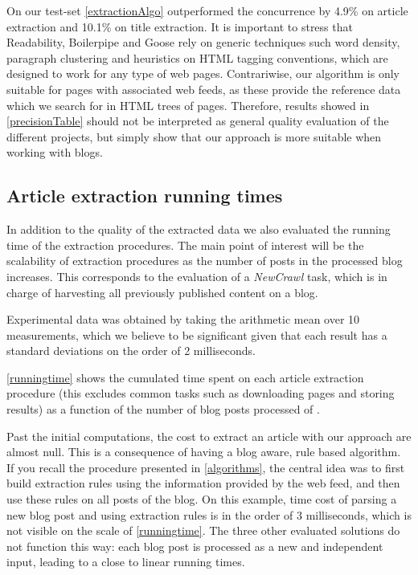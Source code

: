 \precisionTable

On our test-set \autoref{extractionAlgo} outperformed the concurrence by 4.9\% on article extraction and 10.1\% on title extraction. It is important to stress that Readability, Boilerpipe and Goose rely on generic techniques such word density, paragraph clustering and heuristics on HTML tagging conventions, which are designed to work for any type of web pages. Contrariwise, our algorithm is only suitable for pages with associated web feeds, as these provide the reference data which we search for in HTML trees of pages. Therefore, results showed in \autoref{precisionTable} should not be interpreted as general quality evaluation of the different projects, but simply show that our approach is more suitable when working with blogs.


\subsection{Article extraction running times}

In addition to the quality of the extracted data we also evaluated the running time of the extraction procedures. The main point of interest will be the scalability of extraction procedures as the number of posts in the processed blog increases. This corresponds to the evaluation of a \emph{NewCrawl} task, which is in charge of harvesting all previously published content on a blog.

Experimental data was obtained by taking the arithmetic mean over 10 measurements, which we believe to be significant given that each result has a standard deviations on the order of 2 milliseconds. 

\autoref{runningtime} shows the cumulated time spent on each article extraction procedure (this excludes common tasks such as downloading pages and storing results) as a function of the number of blog posts processed of .



Past the initial computations, the cost to extract an article with our approach are almost null. This is a consequence of having a blog aware, rule based algorithm. If you recall the procedure presented in \autoref{algorithms}, the central idea was to first build extraction rules using the information provided by the web feed, and then use these rules on all posts of the blog. On this example, time cost of parsing a new blog post and using extraction rules is in the order of 3 milliseconds, which is not visible on the scale of \autoref{runningtime}. The three other evaluated solutions do not function this way: each blog post is processed as a new and independent input, leading to a close to linear running times.

